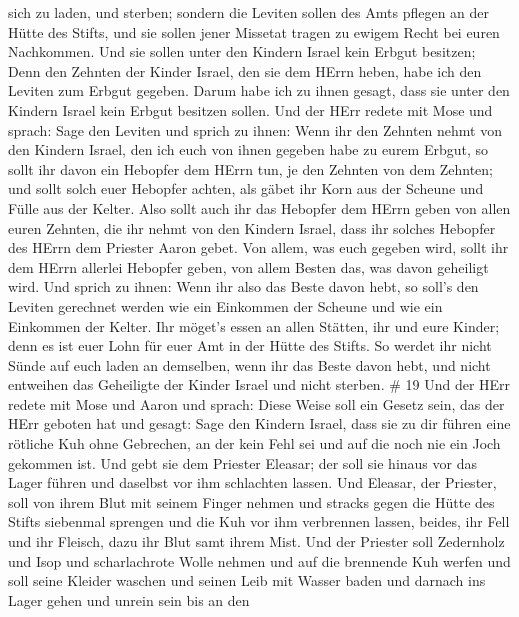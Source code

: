 sich zu laden, und sterben;  sondern die Leviten sollen des
Amts pflegen an der Hütte des Stifts, und sie sollen jener Missetat
tragen zu ewigem Recht bei euren Nachkommen. Und sie sollen unter den
Kindern Israel kein Erbgut besitzen;  Denn den Zehnten der
Kinder Israel, den sie dem HErrn heben, habe ich den Leviten zum Erbgut
gegeben. Darum habe ich zu ihnen gesagt, dass sie unter den Kindern
Israel kein Erbgut besitzen sollen.  Und der HErr redete
mit Mose und sprach:  Sage den Leviten und sprich zu ihnen:
Wenn ihr den Zehnten nehmt von den Kindern Israel, den ich euch von
ihnen gegeben habe zu eurem Erbgut, so sollt ihr davon ein Hebopfer dem
HErrn tun, je den Zehnten von dem Zehnten;  und sollt solch
euer Hebopfer achten, als gäbet ihr Korn aus der Scheune und Fülle aus
der Kelter.  Also sollt auch ihr das Hebopfer dem HErrn
geben von allen euren Zehnten, die ihr nehmt von den Kindern Israel,
dass ihr solches Hebopfer des HErrn dem Priester Aaron gebet.
 Von allem, was euch gegeben wird, sollt ihr dem HErrn
allerlei Hebopfer geben, von allem Besten das, was davon geheiligt wird.
 Und sprich zu ihnen: Wenn ihr also das Beste davon hebt,
so soll's den Leviten gerechnet werden wie ein Einkommen der Scheune und
wie ein Einkommen der Kelter.  Ihr möget's essen an allen
Stätten, ihr und eure Kinder; denn es ist euer Lohn für euer Amt in der
Hütte des Stifts.  So werdet ihr nicht Sünde auf euch laden
an demselben, wenn ihr das Beste davon hebt, und nicht entweihen das
Geheiligte der Kinder Israel und nicht sterben. \# 19  Und
der HErr redete mit Mose und Aaron und sprach:  Diese Weise
soll ein Gesetz sein, das der HErr geboten hat und gesagt: Sage den
Kindern Israel, dass sie zu dir führen eine rötliche Kuh ohne Gebrechen,
an der kein Fehl sei und auf die noch nie ein Joch gekommen ist.
 Und gebt sie dem Priester Eleasar; der soll sie hinaus vor
das Lager führen und daselbst vor ihm schlachten lassen. 
Und Eleasar, der Priester, soll von ihrem Blut mit seinem Finger nehmen
und stracks gegen die Hütte des Stifts siebenmal sprengen 
und die Kuh vor ihm verbrennen lassen, beides, ihr Fell und ihr Fleisch,
dazu ihr Blut samt ihrem Mist.  Und der Priester soll
Zedernholz und Isop und scharlachrote Wolle nehmen und auf die brennende
Kuh werfen  und soll seine Kleider waschen und seinen Leib
mit Wasser baden und darnach ins Lager gehen und unrein sein bis an den
